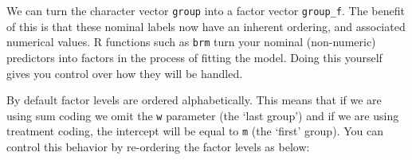 \documentclass[
]{book}
\newenvironment{Shaded}{\begin{snugshade}}{\end{snugshade}}
\newcommand{\AttributeTok}[1]{\textcolor[rgb]{0.77,0.63,0.00}{#1}}
\newcommand{\CommentTok}[1]{\textcolor[rgb]{0.56,0.35,0.01}{\textit{#1}}}
\newcommand{\DocumentationTok}[1]{\textcolor[rgb]{0.56,0.35,0.01}{\textbf{\textit{#1}}}}
\newcommand{\FunctionTok}[1]{\textcolor[rgb]{0.00,0.00,0.00}{#1}}
\newcommand{\NormalTok}[1]{#1}
\newcommand{\OtherTok}[1]{\textcolor[rgb]{0.56,0.35,0.01}{#1}}
\newcommand{\SpecialCharTok}[1]{\textcolor[rgb]{0.00,0.00,0.00}{#1}}
\newcommand{\StringTok}[1]{\textcolor[rgb]{0.31,0.60,0.02}{#1}}
\begin{document}
We can turn the character vector \texttt{group} into a factor vector \texttt{group\_f}. The benefit of this is that these nominal labels now have an inherent ordering, and associated numerical values. R functions such as \texttt{brm} turn your nominal (non-numeric) predictors into factors in the process of fitting the model. Doing this yourself gives you control over how they will be handled.

\begin{Shaded}
\end{Shaded}

By default factor levels are ordered alphabetically. This means that if we are using sum coding we omit the \texttt{w} parameter (the `last group') and if we are using treatment coding, the intercept will be equal to \texttt{m} (the `first' group). You can control this behavior by re-ordering the factor levels as below:

\begin{Shaded}
\end{Shaded}
\end{document}
